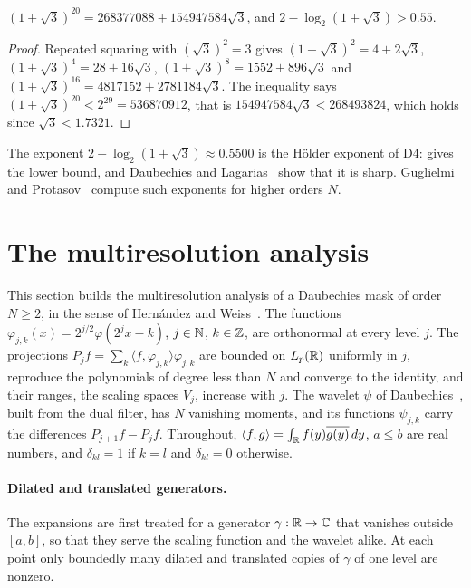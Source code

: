 \begin{proposition}
\label{prop:daub-d4-exponent-value}
\leanok
$(1 + \sqrt 3)^{20} = 268377088 + 154947584 \sqrt 3$, and $2 - \log_2(1 + \sqrt 3) > 0.55$.
\end{proposition}

\begin{proof}
\leanok
Repeated squaring with $(\sqrt 3)^2 = 3$ gives $(1 + \sqrt 3)^2 = 4 + 2 \sqrt 3$,
$(1 + \sqrt 3)^4 = 28 + 16 \sqrt 3$, $(1 + \sqrt 3)^8 = 1552 + 896 \sqrt 3$ and
$(1 + \sqrt 3)^{16} = 4817152 + 2781184 \sqrt 3$. The inequality says
$(1 + \sqrt 3)^{20} < 2^{29} = 536870912$, that is $154947584 \sqrt 3 < 268493824$, which holds
since $\sqrt 3 < 1.7321$.
\end{proof}

The exponent $2 - \log_2(1 + \sqrt 3) \approx 0.5500$ is the H\"older exponent of D4:
 gives the lower bound, and Daubechies and
Lagarias~\cite{DaubechiesLagarias} show that it is sharp. Guglielmi and
Protasov~\cite{GuglielmiProtasov} compute such exponents for higher orders $N$.

\section{The multiresolution analysis}

This section builds the multiresolution analysis of a Daubechies mask of order $N \geq 2$, in
the sense of Hern\'andez and Weiss~\cite{HernandezWeiss}. The functions
$\varphi_{j,k}(x) = 2^{j/2} \varphi(2^j x - k)$, $j \in \mathbb{N}$, $k \in \mathbb{Z}$, are orthonormal at every
level $j$. The projections $P_j f = \sum_k \langle f, \varphi_{j,k} \rangle \varphi_{j,k}$
are bounded on $L_p(\mathbb{R})$ uniformly in $j$, reproduce the polynomials of degree less than $N$ and
converge to the identity, and their ranges, the scaling spaces $V_j$, increase with $j$. The
wavelet $\psi$ of Daubechies~\cite{Daubechies}, built from the dual filter, has $N$ vanishing
moments, and its functions $\psi_{j,k}$ carry the differences $P_{j+1} f - P_j f$. Throughout,
$\langle f, g \rangle = \int_{\mathbb{R}} f(y) \overline{g(y)} \, dy$, $a \leq b$ are real numbers, and
$\delta_{kl} = 1$ if $k = l$ and $\delta_{kl} = 0$ otherwise.

\paragraph{Dilated and translated generators.}
The expansions are first treated for a generator $\gamma : \mathbb{R} \to \mathbb{C}$ that vanishes outside
$[a, b]$, so that they serve the scaling function and the wavelet alike. At each point only
boundedly many dilated and translated copies of $\gamma$ of one level are nonzero.

